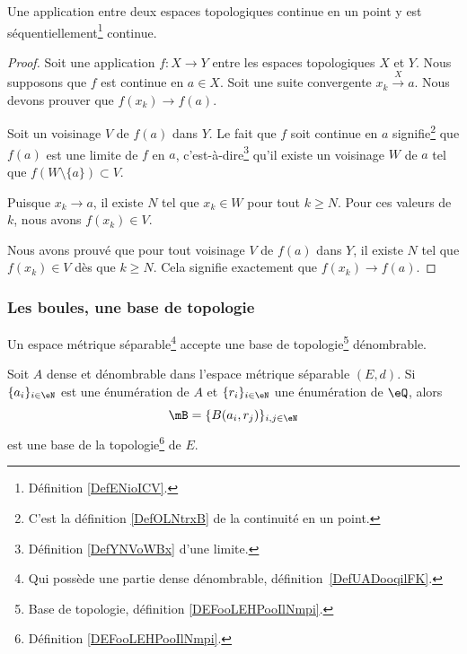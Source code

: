 \begin{corollary}		\label{PropFnContParSuite}
	Une application entre deux espaces topologiques continue en un point y est séquentiellement\footnote{Définition \ref{DefENioICV}.} continue.
\end{corollary}

\begin{proof}
	Soit une application \( f\colon X\to Y\) entre les espaces topologiques \( X\) et \( Y\). Nous supposons que \( f\) est continue en \( a\in X\). Soit une suite convergente \( x_k\stackrel{X}{\longrightarrow}a\). Nous devons prouver que \( f(x_k)\to f(a)\).

	Soit un voisinage \( V\) de \( f(a)\) dans \( Y\). Le fait que \( f\) soit continue en \( a\) signifie\footnote{C'est la définition \ref{DefOLNtrxB} de la continuité en un point.} que \( f(a)\) est une limite de \( f\) en \( a\), c'est-à-dire\footnote{Définition \ref{DefYNVoWBx} d'une limite.} qu'il existe un voisinage \( W\) de \( a\) tel que \( f(W\setminus\{ a \})\subset V\).

	Puisque \( x_k\to a\), il existe \( N\) tel que \( x_k\in W\) pour tout \( k\geq N\). Pour ces valeurs de \( k\), nous avons \( f(x_k)\in V\).

	Nous avons prouvé que pour tout voisinage \( V\) de \( f(a)\) dans \( Y\), il existe \( N\) tel que \( f(x_k)\in V\) dès que \( k\geq N\). Cela signifie exactement que \( f(x_k)\to f(a)\).
\end{proof}

\subsubsection{Les boules, une base de topologie}

\begin{proposition} \label{PropNBSooraAFr}
	Un espace métrique séparable\footnote{Qui possède une partie dense dénombrable, définition~\ref{DefUADooqilFK}.} accepte une base de topologie\footnote{Base de topologie, définition \ref{DEFooLEHPooIlNmpi}.} dénombrable.

	Soit \( A\) dense et dénombrable dans l'espace métrique séparable \( (E,d)\). Si \( \{ a_i \}_{i\in \eN}\) est une énumération de \( A\) et \( \{ r_i \}_{i\in \eN}\) une énumération de \( \eQ\), alors
	\begin{equation}
		\mB=\{ B(a_i,r_j) \}_{i,j\in \eN}
	\end{equation}
	est une base de la topologie\footnote{Définition \ref{DEFooLEHPooIlNmpi}.} de \( E\).
\end{proposition}

